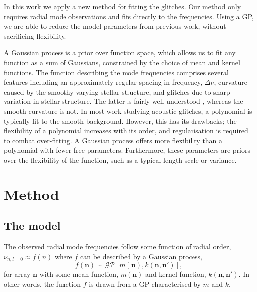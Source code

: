 \documentclass[linenumbers,modern]{aastex631dm}
\begin{document}
In this work we apply a new method for fitting the glitches. Our method only
requires radial mode observations and fits directly to the frequencies. Using
a GP, we are able to reduce the model parameters from previous work, without
sacrificing flexibility. 

A Gaussian process is a prior over function space, which allows us to fit any
function as a sum of Gaussians, constrained by the choice of mean and kernel
functions. The function describing the mode frequencies comprises several
features including an approximately regular spacing in frequency,
\(\Delta\nu\), curvature caused by the smoothy varying stellar structure, and
glitches due to sharp variation in stellar structure. The latter is fairly well
understood \citep{Houdek:2007}, whereas the smooth curvature is not. In
most work studying acoustic glitches, a polynomial is typically fit
to the smooth background. However, this has its drawbacks; the flexibility
of a polynomial increases with its order, and regularisation is required to
combat over-fitting. A Gaussian process offers more flexibility than a
polynomial with fewer free parameters. Furthermore, these parameters are priors
over the flexibility of the function, such as a typical length scale or
variance.


\section{Method}\label{sec:method}


\subsection{The model}\label{sec:model}

The observed radial mode frequencies follow some function of radial order,
\(\nu_{n,l=0} \approx f(n)\) where \(f\) can be described by a Gaussian process,
%
\begin{equation}
    f(\bm n) \sim \mathcal{GP}\left[m(\bm n), k(\bm n, \bm n')\right],
\end{equation}
%
for array \(\bm n\) with some mean function, \(m(\bm n)\) and kernel function,
\(k(\bm n, \bm n')\). In other words, the function \(f\) is drawn from a GP
characterised by \(m\) and \(k\).
\end{document}
